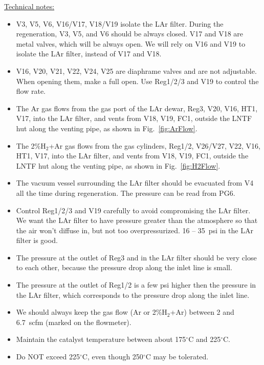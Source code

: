 \documentclass[letterpaper,11pt]{article}
\newcommand{\Hydro}     {H$_2$}
\newcommand{\dC}        {$^\circ$C}
\begin{document}
\underline{Technical notes:}
\begin{itemize}
\setlength\itemsep{-0.2em}
\item V3, V5, V6, V16/V17, V18/V19 isolate the LAr filter.  
During the regeneration, V3, V5, and V6 should be always closed.  
V17 and V18 are metal valves, which will be always open.
We will rely on V16 and V19 to isolate the LAr filter, instead of V17 and V18.
\item V16, V20, V21, V22, V24, V25 are diaphrame valves and are not adjustable.
When opening them, make a full open.
Use Reg1/2/3 and V19 to control the flow rate.
\item The Ar gas flows from the gas port of the LAr dewar, Reg3, V20, V16, HT1, V17, into the LAr filter, 
and vents from V18, V19, FC1, outside the LNTF hut along the venting pipe, as shown in 
Fig.~\ref{fig:ArFlow}.
\item The 2\%{\Hydro}+Ar gas flows from the gas cylinders, Reg1/2, V26/V27, V22, V16, HT1, V17, 
into the LAr filter, 
and vents from V18, V19, FC1, outside the LNTF hut along the venting pipe, 
as shown in Fig.~\ref{fig:H2Flow}.
\item The vacuum vessel surrounding the LAr filter should be evacuated from V4 all the time during regeneration.  
The pressure can be read from PG6.
\item Control Reg1/2/3 and V19 carefully to avoid compromising the LAr filter.  We want the LAr filter to have pressure 
greater than the atmosphere so that the air won't diffuse in, but not too overpressurized.  
16 -- 35~psi in the LAr filter is good.
\item The pressure at the outlet of Reg3 and in the LAr filter should be very close to each other,
because the pressure drop along the inlet line is small.
\item The pressure at the outlet of Reg1/2 is a few psi higher then the pressure in the LAr filter,
which corresponds to the pressure drop along the inlet line. 
\item We should always keep the gas flow (Ar or 2\%{\Hydro}+Ar) between 2 and 6.7~scfm (marked on the flowmeter).
\item Maintain the catalyst temperature between about 175{\dC} and 225{\dC}.
\item Do NOT exceed 225{\dC}, even though 250{\dC} may be tolerated.

\end{itemize}
\end{document}
